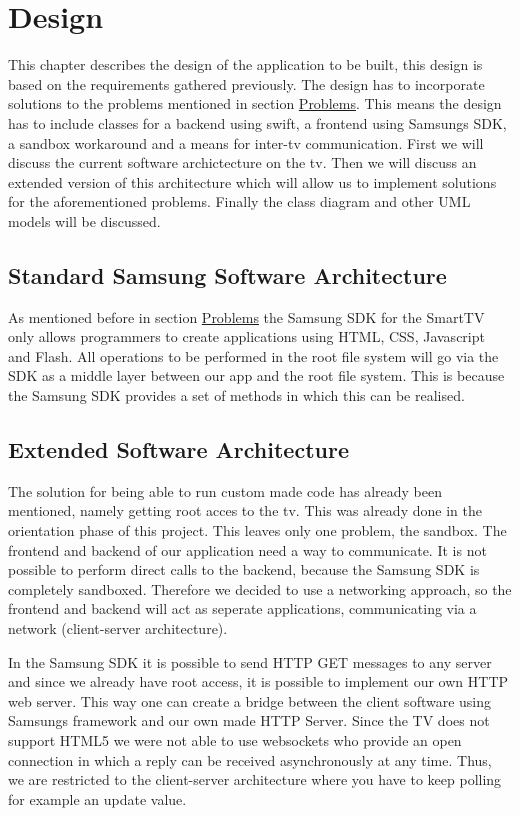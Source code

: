 \chapter{Design}
This chapter describes the design of the application to be built, this design is based on the requirements gathered previously. The design has to
incorporate solutions to the problems mentioned in section \hyperref[sec:problems]{Problems}.
This means the design has to include classes for a backend using swift, a frontend using Samsung\textquotesingle s SDK, a sandbox workaround and a
 means for inter-tv communication. First we will discuss the current software archictecture on the tv. Then we will discuss an extended version of
 this architecture
which will allow us to implement solutions for the aforementioned problems. Finally the class diagram and other UML models will be discussed.

\section{Standard Samsung Software Architecture}
As mentioned before in section \hyperref[sec:problems]{Problems}
the Samsung SDK for the SmartTV only allows programmers to create applications using HTML, CSS, Javascript and Flash.
All operations to be performed in the root file system will go via the SDK as a middle layer between our app and the root file system. This is
because the Samsung SDK provides a set of methods in which this can be realised.

\section{Extended Software Architecture}
The solution for being able to run custom made code has already been mentioned, namely getting root acces to the tv.
This was already done in the orientation phase of this project. This leaves only one problem, the sandbox.
The frontend and backend of our application need a way to communicate. It is not possible to perform direct calls to the backend, because the 
Samsung SDK is completely sandboxed. Therefore we decided to use a networking approach, so the frontend and backend will act as seperate 
applications, communicating via a network (client-server architecture).

In the Samsung SDK it is possible to send HTTP GET messages to any server and since we already have root access, it is possible to implement
our own HTTP web server. This way one can create a bridge between the client software using Samsung\textquotesingle s framework and our own made 
HTTP Server. Since the TV does not support HTML5 we were not able to use websockets who provide an open connection in which a reply can be 
received asynchronously at any time. Thus, we are restricted to the client-server architecture where you have to keep polling for example an 
update value.

